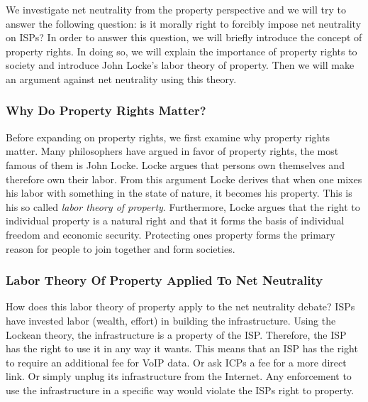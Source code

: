 
We investigate net neutrality from the property perspective and we will try to answer the following question: is it morally right to forcibly impose net neutrality on \acp{ISP}? In order to answer this question, we will briefly introduce the concept of property rights. In doing so, we will explain the importance of property rights to society and introduce John Locke's labor theory of property. Then we will make an argument against net neutrality using this theory.

\subsubsection{Why Do Property Rights Matter?}
Before expanding on property rights, we first examine why property rights matter. Many philosophers have argued in favor of property rights, the most famous of them is John Locke. Locke argues that persons own themselves and therefore own their labor. From this argument Locke derives that when one mixes his labor with something in the state of nature, it becomes his property. This is his so called \emph{labor theory of property}. Furthermore, Locke argues that the right to individual property is a natural right and that it forms the basis of individual freedom and economic security. Protecting ones property forms the primary reason for people to join together and form societies.

\subsubsection{Labor Theory Of Property Applied To Net Neutrality}
How does this labor theory of property apply to the net neutrality debate? \acp{ISP} have invested labor (wealth, effort) in building the infrastructure. Using the Lockean theory, the infrastructure is a property of the \ac{ISP}. Therefore, the \ac{ISP} has the right to use it in any way it wants. This means that an \ac{ISP} has the right to require an additional fee for \ac{VoIP} data. Or ask ICPs a fee for a more direct link. Or simply unplug its infrastructure from the Internet. Any enforcement to use the infrastructure in a specific way would violate the \acp{ISP} right to property.

